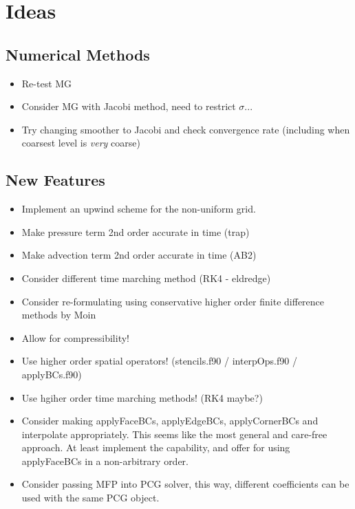 \documentclass[11pt]{article}
\begin{document}
\section{Ideas}

\subsection{Numerical Methods}
\begin{itemize}
\setlength\itemsep{-1em}
\item Re-test MG
\item Consider MG with Jacobi method, need to restrict $\sigma$...
\item Try changing smoother to Jacobi and check convergence rate (including when coarsest level is \textit{very} coarse)
\end{itemize}

\subsection{New Features}
\begin{itemize}
\setlength\itemsep{-1em}
\item Implement an upwind scheme for the non-uniform grid.
\item Make pressure term 2nd order accurate in time (trap)
\item Make advection term 2nd order accurate in time (AB2)
\item Consider different time marching method (RK4 - eldredge)
\item Consider re-formulating using conservative higher order finite difference methods by Moin
\item Allow for compressibility!
\item Use higher order spatial operators! (stencils.f90 / interpOps.f90 / applyBCs.f90)
\item Use hgiher order time marching methods! (RK4 maybe?)
\item Consider making applyFaceBCs, applyEdgeBCs, applyCornerBCs and interpolate appropriately. This seems like the most general and care-free approach. At least implement the capability, and offer for using applyFaceBCs in a non-arbitrary order.
\item Consider passing MFP into PCG solver, this way, different coefficients can be used with the same PCG object.
\end{itemize}
\end{document}
